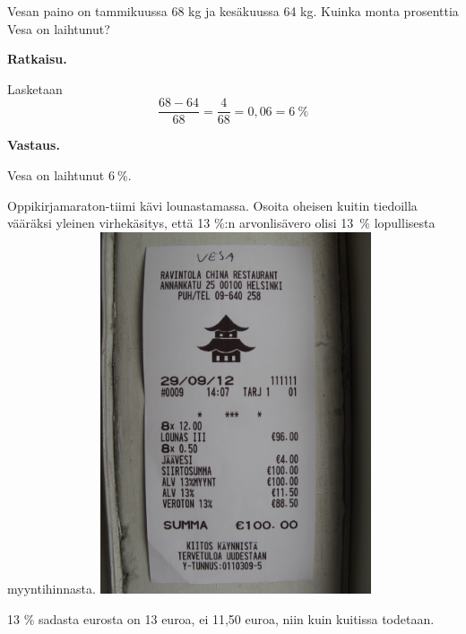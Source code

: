 \begin{esimerkki}
Vesan paino on tammikuussa 68 kg ja kesäkuussa 64 kg. Kuinka monta prosenttia Vesa on laihtunut?

\textbf{Ratkaisu.}

Lasketaan 
\begin{equation*}
\frac{68-64}{68} = \frac{4}{68}=0,06 = 6\ \%
\end{equation*}

\textbf{Vastaus.}

Vesa on laihtunut $6\ \%$.
\end{esimerkki}

\begin{tehtava}

Oppikirjamaraton-tiimi kävi lounastamassa. Osoita oheisen kuitin tiedoilla vääräksi yleinen virhekäsitys, että 13 \%:n arvonlisävero olisi 13~\% lopullisesta myyntihinnasta.
\includegraphics[width=80mm, angle=270]{02-yhtalot/kuvia/alv-kuitti}

\begin{vastaus}
13 \% sadasta eurosta on 13 euroa, ei 11,50 euroa, niin kuin kuitissa todetaan.
\end{vastaus}


\end{tehtava}



